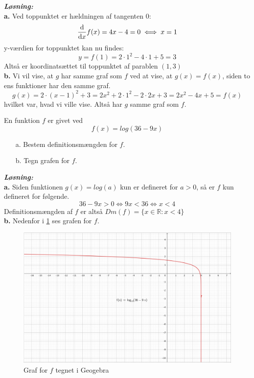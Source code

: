 \documentclass{article}
\newcommand{\sol}{\setlength{\parindent}{0cm}\textbf{\textit{Løsning:}}\setlength{\parindent}{1cm}}
\begin{document}
\sol \\ 
\textbf{a.} Ved toppunktet er hældningen af tangenten 0:
\[
\dv{x} f(x)= 4x-4=0 \iff x=1
\] 
y-værdien for toppunktet kan nu findes:
\[
y=f(1)=2\cdot 1^2 - 4\cdot 1+5=3
\] 
Altså er koordinatsættet til toppunktet af parablen $(1, 3)$ \\[1ex] 
\textbf{b.} Vi vil vise, at $g$ har samme graf som $f$ ved at vise, at $g(x)=f(x)$, siden to ens funktioner har den samme graf.
\[
g(x)=2 \cdot(x-1)^2+3=2x^2+2 \cdot 1^2-2\cdot 2x+3=2x^2-4x+5=f(x)
\] 
hvilket var, hvad vi ville vise. Altså har $g$ samme graf som $f$. 
\pagebreak
\begin{question}{}{}
En funktion $f$ er givet ved
\[
  f(x)=log(36-9x)
\] 
\begin{itemize}
  \item[a.] Bestem definitionsmængden for $f$.
  \item[b.] Tegn grafen for $f$.
\end{itemize}
\end{question}
\sol \\ 
\textbf{a.} Siden funktionen $g(x)=log(a)$ kun er defineret for $a>0$, så er $f$ kun defineret for følgende.
\[
36-9x>0 \iff 9x<36 \iff x<4
\] 
Definitionsmængden af $f$ er altså $Dm(f)=\{x \in \mathbb{R}:x<4\}$ \\[1ex] 
\textbf{b.}
Nedenfor i \cref{fig:f} ses grafen for $f$.
\begin{figure}[h]
\begin{center}
  \includegraphics[width=\textwidth]{mat15graf.png}
\end{center}
\caption{Graf for $f$ tegnet i Geogebra}
\label{fig:f}
\end{figure}
\end{document}
